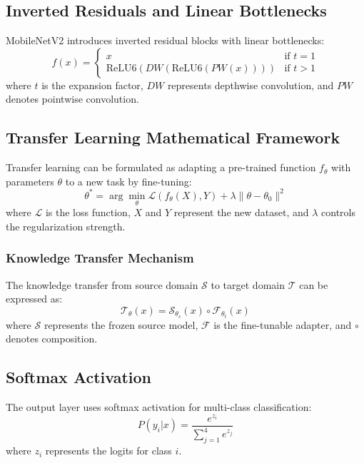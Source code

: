 \documentclass[conference,10pt,letterpaper]{IEEEtran}
\begin{document}
\subsection{Inverted Residuals and Linear Bottlenecks}

MobileNetV2 introduces inverted residual blocks with linear bottlenecks:
\begin{equation}
f(x) = \begin{cases}
x & \text{if } t = 1 \\
\text{ReLU6}(DW(\text{ReLU6}(PW(x)))) & \text{if } t > 1
\end{cases}
\end{equation}
where $t$ is the expansion factor, $DW$ represents depthwise convolution, and $PW$ denotes pointwise convolution.

\subsection{Transfer Learning Mathematical Framework}

Transfer learning can be formulated as adapting a pre-trained function $f_{\theta}$ with parameters $\theta$ to a new task by fine-tuning:
\begin{equation}
\theta^* = \arg\min_{\theta} \mathcal{L}(f_{\theta}(X), Y) + \lambda \|\theta - \theta_0\|^2
\end{equation}
where $\mathcal{L}$ is the loss function, $X$ and $Y$ represent the new dataset, and $\lambda$ controls the regularization strength.

\subsubsection{Knowledge Transfer Mechanism}
The knowledge transfer from source domain $\mathcal{S}$ to target domain $\mathcal{T}$ can be expressed as:
\begin{equation}
\mathcal{T}_{\theta}(x) = \mathcal{S}_{\theta_s}(x) \circ \mathcal{F}_{\theta_t}(x)
\end{equation}
where $\mathcal{S}$ represents the frozen source model, $\mathcal{F}$ is the fine-tunable adapter, and $\circ$ denotes composition.

\subsection{Softmax Activation}

The output layer uses softmax activation for multi-class classification:
\begin{equation}
P(y_i|x) = \frac{e^{z_i}}{\sum_{j=1}^{4} e^{z_j}}
\end{equation}
where $z_i$ represents the logits for class $i$.
\end{document}
